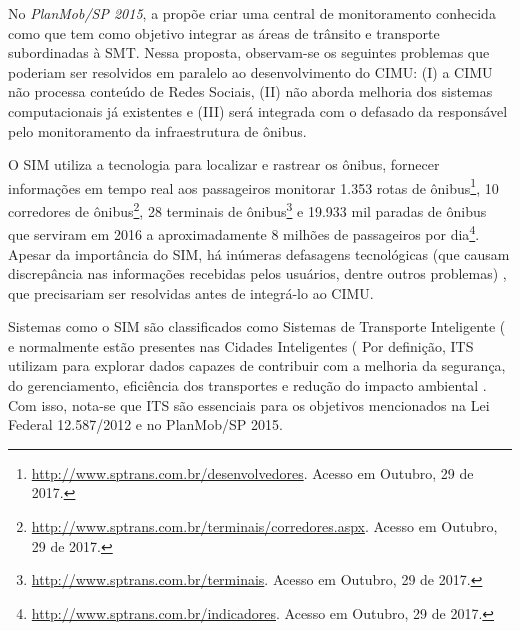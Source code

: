 \documentclass[
	12pt,				%
	oneside,			%
	a4paper,			%
	english,			%
	brazil				%
	]{abntex2ppgsi}
\begin{document}
No \textit{PlanMob/SP 2015}, a  propõe criar uma central de monitoramento conhecida como  que tem como objetivo integrar as áreas de trânsito e transporte subordinadas à SMT. Nessa proposta, observam-se os seguintes problemas que poderiam ser resolvidos em paralelo ao desenvolvimento do CIMU: (I) a CIMU não processa conteúdo de Redes Sociais, (II) não aborda melhoria dos sistemas computacionais já existentes e (III) será integrada com o defasado  da  responsável pelo monitoramento da infraestrutura de ônibus. 

O SIM utiliza a tecnologia  para localizar e rastrear os ônibus, fornecer informações em tempo real aos passageiros  monitorar 1.353 rotas de ônibus\footnote{\label{gtfsSptrans}\url{http://www.sptrans.com.br/desenvolvedores}. Acesso em Outubro, 29 de 2017.}, 10 corredores de ônibus\footnote{\url{http://www.sptrans.com.br/terminais/corredores.aspx}. Acesso em Outubro, 29 de 2017.}, 28 terminais de ônibus\footnote{\url{http://www.sptrans.com.br/terminais}. Acesso em Outubro, 29 de 2017.} e 19.933 mil paradas de ônibus que serviram em 2016 a aproximadamente 8 milhões de passageiros por dia\footnote{\url{http://www.sptrans.com.br/indicadores}. Acesso em Outubro, 29 de 2017.}. Apesar da importância do SIM, há inúmeras defasagens tecnológicas (que causam discrepância nas informações recebidas pelos usuários, dentre outros problemas) \cite{consulo2016evaluation}, que precisariam ser resolvidas antes de integrá-lo ao CIMU.
 
Sistemas como o SIM são classificados como Sistemas de Transporte Inteligente ( e normalmente estão presentes nas Cidades Inteligentes ( Por definição, ITS utilizam  para explorar dados capazes de contribuir com a melhoria da segurança, do gerenciamento, eficiência dos transportes e redução do impacto ambiental \cite{Anttiroiko2013}. Com isso, nota-se que ITS são essenciais para os objetivos mencionados na Lei Federal 12.587/2012 e no PlanMob/SP 2015.  
\end{document}
